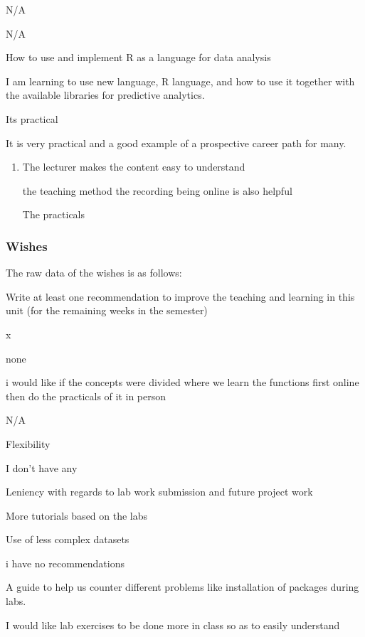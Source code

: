 \documentclass[
]{article}
\providecommand{\tightlist}{%
  \setlength{\itemsep}{0pt}\setlength{\parskip}{0pt}}
\begin{document}
\begin{enumerate}
\begin{itemize}
    N/A

    N/A~

    How to use and implement R as a language for data analysis

    I am learning to use new language, R language, and how to use it
    together with the available libraries for predictive analytics. ~

    Its practical~

    It is very practical and a good example of a prospective career path
    for many.

    \begin{enumerate}
    \def\labelenumii{\arabic{enumii}.}
    \tightlist
    \item
      The lecturer makes the content easy to understand

      the teaching method the recording being online is also helpful~

      The practicals
    \end{enumerate}
  \end{itemize}
\end{enumerate}

\newpage

\subsubsection{Wishes}\label{wishes}

The raw data of the wishes is as follows:

Write at least one recommendation to improve the teaching and learning
in this unit (for the remaining weeks in the semester)

x

none

i would like if the concepts were divided where we learn the functions
first online then do the practicals of it in person

N/A

Flexibility

I don't have any~

Leniency with regards to lab work submission and future project work

More tutorials based on the labs

Use of less complex datasets

i have no recommendations

A guide to help us counter different problems like installation of
packages during labs.

I would like lab exercises to be done more in class so as to easily
understand~
\end{document}
